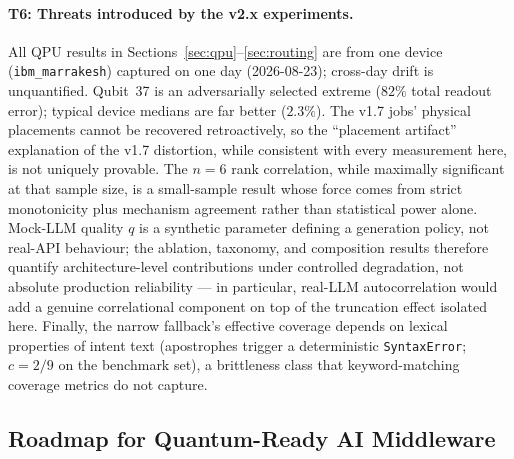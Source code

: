 ﻿\documentclass[12pt,a4paper]{article}
\begin{document}
\paragraph{T6: Threats introduced by the v2.x experiments.} All QPU results in Sections~\ref{sec:qpu}--\ref{sec:routing} are from one device (\texttt{ibm\_marrakesh}) captured on one day (2026-08-23); cross-day drift is unquantified. Qubit~37 is an adversarially selected extreme ($82\%$ total readout error); typical device medians are far better ($2.3\%$). The v1.7 jobs' physical placements cannot be recovered retroactively, so the ``placement artifact'' explanation of the v1.7 distortion, while consistent with every measurement here, is not uniquely provable. The $n{=}6$ rank correlation, while maximally significant at that sample size, is a small-sample result whose force comes from strict monotonicity plus mechanism agreement rather than statistical power alone. Mock-LLM quality $q$ is a synthetic parameter defining a generation policy, not real-API behaviour; the ablation, taxonomy, and composition results therefore quantify architecture-level contributions under controlled degradation, not absolute production reliability --- in particular, real-LLM autocorrelation would add a genuine correlational component on top of the truncation effect isolated here. Finally, the narrow fallback's effective coverage depends on lexical properties of intent text (apostrophes trigger a deterministic \texttt{SyntaxError}; $c = 2/9$ on the benchmark set), a brittleness class that keyword-matching coverage metrics do not capture.

\subsection{Roadmap for Quantum-Ready AI Middleware}\label{sec:roadmap}
\end{document}
